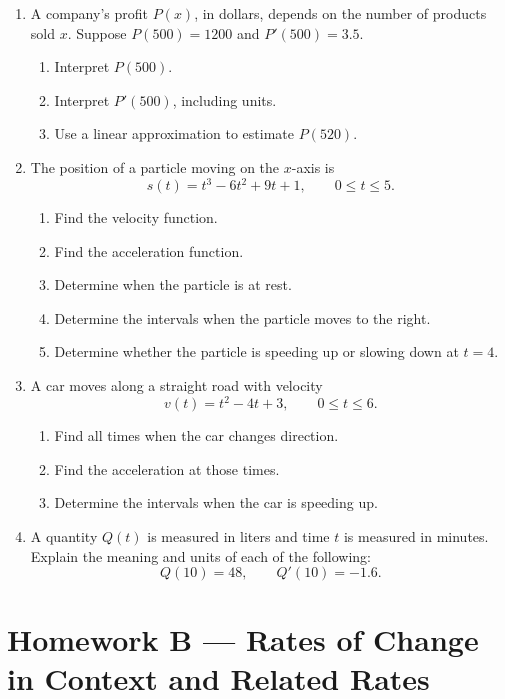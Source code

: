 \documentclass[11pt]{article}
\begin{document}
\begin{enumerate}
    \item A company's profit \(P(x)\), in dollars, depends on the number of products sold \(x\).  
    Suppose \(P(500)=1200\) and \(P'(500)=3.5\).
    \begin{enumerate}
        \item Interpret \(P(500)\).
        \item Interpret \(P'(500)\), including units.
        \item Use a linear approximation to estimate \(P(520)\).
    \end{enumerate}

    \item The position of a particle moving on the \(x\)-axis is
    \[
    s(t)=t^3-6t^2+9t+1,\qquad 0\le t\le 5.
    \]
    \begin{enumerate}
        \item Find the velocity function.
        \item Find the acceleration function.
        \item Determine when the particle is at rest.
        \item Determine the intervals when the particle moves to the right.
        \item Determine whether the particle is speeding up or slowing down at \(t=4\).
    \end{enumerate}

    \item A car moves along a straight road with velocity
    \[
    v(t)=t^2-4t+3,\qquad 0\le t\le 6.
    \]
    \begin{enumerate}
        \item Find all times when the car changes direction.
        \item Find the acceleration at those times.
        \item Determine the intervals when the car is speeding up.
    \end{enumerate}

    \item A quantity \(Q(t)\) is measured in liters and time \(t\) is measured in minutes.
    Explain the meaning and units of each of the following:
    \[
    Q(10)=48,\qquad Q'(10)=-1.6.
    \]
\end{enumerate}

\bigskip
\newpage
\section*{Homework B --- Rates of Change in Context and Related Rates}
\end{document}
